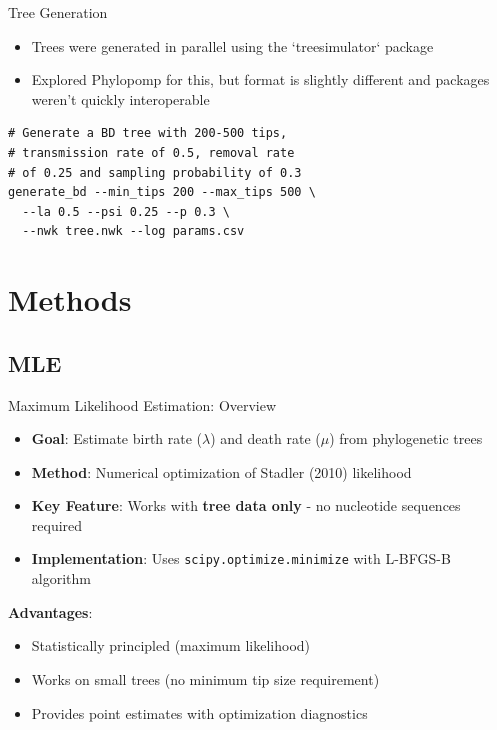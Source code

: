 \documentclass{beamer}
\begin{document}
\begin{frame}[fragile]{Tree Generation}

\begin{itemize}
    \item Trees were generated in parallel using the `treesimulator` package
    \item Explored Phylopomp for this, but format is slightly different and packages weren't quickly interoperable
\end{itemize}



\begin{lstlisting}
# Generate a BD tree with 200-500 tips, 
# transmission rate of 0.5, removal rate 
# of 0.25 and sampling probability of 0.3
generate_bd --min_tips 200 --max_tips 500 \
  --la 0.5 --psi 0.25 --p 0.3 \ 
  --nwk tree.nwk --log params.csv

\end{lstlisting}
\end{frame}


\section{Methods}

\subsection{MLE}
\begin{frame}{Maximum Likelihood Estimation: Overview}
    \begin{itemize}
        \item \textbf{Goal}: Estimate birth rate ($\lambda$) and death rate ($\mu$) from phylogenetic trees
        \item \textbf{Method}: Numerical optimization of Stadler (2010) likelihood
        \item \textbf{Key Feature}: Works with \textbf{tree data only} - no nucleotide sequences required
        \item \textbf{Implementation}: Uses \texttt{scipy.optimize.minimize} with L-BFGS-B algorithm
    \end{itemize}
    
    \vspace{0.3cm}
    \textbf{Advantages}:
    \begin{itemize}
        \item Statistically principled (maximum likelihood)
        \item Works on small trees (no minimum tip size requirement)
        \item Provides point estimates with optimization diagnostics
    \end{itemize}
\end{frame}
\end{document}
